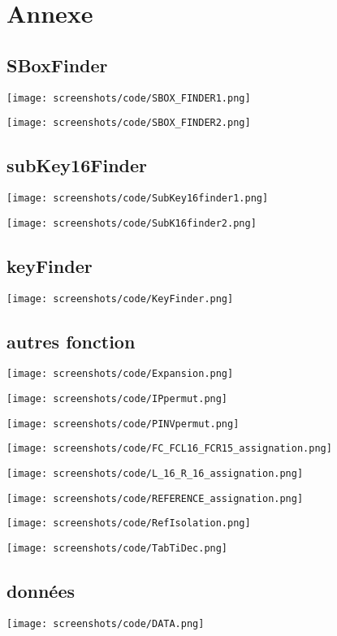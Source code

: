 \documentclass[a4paper,11pt]{article}
\begin{document}
	\section{Annexe}
		\subsection{SBoxFinder}
			\begin{center}\texttt{[image: screenshots/code/SBOX\_FINDER1.png]}\end{center} 
			\begin{center}\texttt{[image: screenshots/code/SBOX\_FINDER2.png]}\end{center} 
		\subsection{subKey16Finder}
			\begin{center}\texttt{[image: screenshots/code/SubKey16finder1.png]}\end{center} 
			\begin{center}\texttt{[image: screenshots/code/SubK16finder2.png]}\end{center}
		\subsection{keyFinder}
			\begin{center}\texttt{[image: screenshots/code/KeyFinder.png]}\end{center} 
		\subsection{autres fonction}
			\begin{center}\texttt{[image: screenshots/code/Expansion.png]}\end{center} 
			\begin{center}\texttt{[image: screenshots/code/IPpermut.png]}\end{center}
			\begin{center}\texttt{[image: screenshots/code/PINVpermut.png]}\end{center} 
			\begin{center}\texttt{[image: screenshots/code/FC\_FCL16\_FCR15\_assignation.png]}\end{center} 
			\begin{center}\texttt{[image: screenshots/code/L\_16\_R\_16\_assignation.png]}\end{center} 
			\begin{center}\texttt{[image: screenshots/code/REFERENCE\_assignation.png]}\end{center} 
			\begin{center}\texttt{[image: screenshots/code/RefIsolation.png]}\end{center} 
			\begin{center}\texttt{[image: screenshots/code/TabTiDec.png]}\end{center} 
		\subsection{données}
			\begin{center}\texttt{[image: screenshots/code/DATA.png]}\end{center} 
\end{document}
